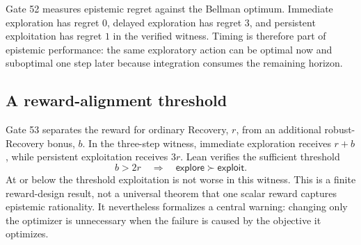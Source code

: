 Gate 52 measures epistemic regret against the Bellman optimum. Immediate exploration has regret $0$, delayed exploration has regret $3$, and persistent exploitation has regret $1$ in the verified witness. Timing is therefore part of epistemic performance: the same exploratory action can be optimal now and suboptimal one step later because integration consumes the remaining horizon.

\subsection{A reward-alignment threshold}

Gate 53 separates the reward for ordinary Recovery, $r$, from an additional robust-Recovery bonus, $b$. In the three-step witness, immediate exploration receives $r+b$, while persistent exploitation receives $3r$. Lean verifies the sufficient threshold
\[
\boxed{b>2r\quad\Longrightarrow\quad \textsf{explore}\succ\textsf{exploit}.}
\]
At or below the threshold exploitation is not worse in this witness. This is a finite reward-design result, not a universal theorem that one scalar reward captures epistemic rationality. It nevertheless formalizes a central warning: changing only the optimizer is unnecessary when the failure is caused by the objective it optimizes.
